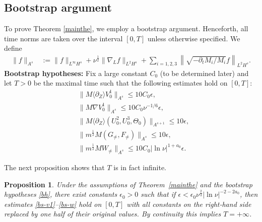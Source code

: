 \documentclass[12pt]{article}
\newcommand{\wtb}{\langle\partial_Z\rangle }
\newtheorem{proposition}{Proposition}[section]
\numberwithin{equation}{section}
\begin{document}
    \subsection{Bootstrap argument}
    To prove Theorem \ref{mainthe}, we employ a bootstrap argument. Henceforth, all time norms are taken over the interval $[0,T]$ unless otherwise specified.
    We define
\begin{align*}
        \|f\|_{A^s} &:=\|f\|_{L^{\infty}H^s}+\nu^{\frac{1}{2}}\|\nabla_L f\|_{L^2H^s}
                 +\sum_{i=1,2,3}\left\|\sqrt{-\partial_tM_i/M_i}f\right\|_{L^2H^s}.
\end{align*}
    \textbf{Bootstrap hypotheses:} Fix a large constant $C_0$ (to be determined later) and let $T>0$ be the maximal time such that the following estimates hold on $[0,T]$:
    \begin{subequations}\label{bh}
        \begin{align}
    	&\|M\wtb V^1_0\|_{A^s}\leq10C_0\epsilon,\label{bs-v1}\\
    	&\|M\nabla V^1_0\|_{A^{s}}\leq10C_0\nu^{-1/6}\epsilon,\label{bs-v1h}\\
    	&\|M\wtb(U^2_0,U^3_0,\Theta_0)\|_{A^{s+1}}\leq10\epsilon,\label{bs-u20}\\
    	&\|m^{\frac{1}{2}}M(G_{\neq},F_{\neq})\|_{A^s}\leq 10\epsilon,\label{bs-gf}\\
    	&\|m^{\frac{1}{2}}MW_{\neq}\|_{A^s}\leq 10C_0 |\ln{\nu} |^{1+a_0}\epsilon.\label{bs-w}
    \end{align}
    \end{subequations}
    

    The next proposition shows that $T$ is in fact infinite.

\begin{proposition}\label{bsup1}
    Under the assumptions of Theorem~\ref{mainthe} and the bootstrap hypotheses \eqref{bh}, there exist constants $\epsilon_0>0$ such that if $\epsilon<\epsilon_0\nu^{\frac{2}{3}}|\ln\nu|^{-2-2a_0}$, then estimates \eqref{bs-v1}--\eqref{bs-w} hold on $[0,T]$ with all constants on the right‑hand side replaced by one half of their original values. By continuity this implies $T=+\infty$.
\end{proposition}
\end{document}
